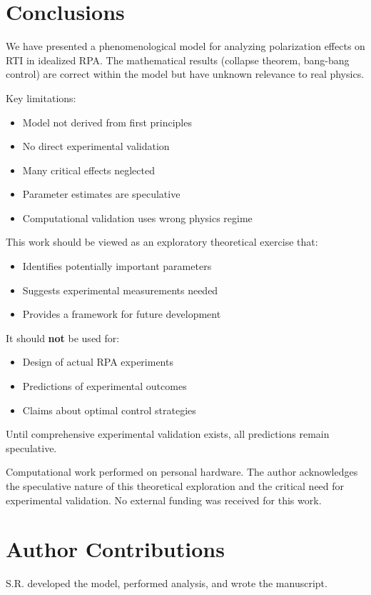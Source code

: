\documentclass[aps,pre,twocolumn,showpacs,superscriptaddress]{revtex4-2}
\theoremstyle{definition}
\begin{document}
\section{Conclusions}\label{sec:conclusions}

We have presented a phenomenological model for analyzing polarization effects on RTI in idealized RPA. The mathematical results (collapse theorem, bang-bang control) are correct within the model but have unknown relevance to real physics.

Key limitations:
\begin{itemize}
\item Model not derived from first principles
\item No direct experimental validation
\item Many critical effects neglected
\item Parameter estimates are speculative
\item Computational validation uses wrong physics regime
\end{itemize}

This work should be viewed as an exploratory theoretical exercise that:
\begin{itemize}
\item Identifies potentially important parameters
\item Suggests experimental measurements needed
\item Provides a framework for future development
\end{itemize}

It should \textbf{not} be used for:
\begin{itemize}
\item Design of actual RPA experiments
\item Predictions of experimental outcomes
\item Claims about optimal control strategies
\end{itemize}

Until comprehensive experimental validation exists, all predictions remain speculative.

\begin{acknowledgments}
Computational work performed on personal hardware. The author acknowledges the speculative nature of this theoretical exploration and the critical need for experimental validation. No external funding was received for this work.
\end{acknowledgments}

\section*{Author Contributions}
S.R. developed the model, performed analysis, and wrote the manuscript.
\end{document}
